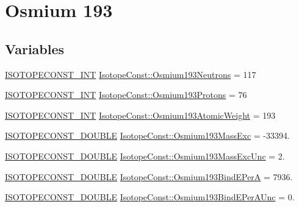 \hypertarget{group___isotope_const-_osmium-_os193}{}\section{Osmium 193}
\label{group___isotope_const-_osmium-_os193}
\subsection*{Variables}
\begin{DoxyCompactItemize}
\item 
\mbox{\hyperlink{group___isotope_const-_macros_ga5f18360b3e99483a35c32d789e62621c}{I\+S\+O\+T\+O\+P\+E\+C\+O\+N\+S\+T\+\_\+\+I\+NT}} \mbox{\hyperlink{group___isotope_const-_osmium-_os193_gaa1ee9d94e0ae684cde3d64fd0a91d388}{Isotope\+Const\+::\+Osmium193\+Neutrons}} = 117
\item 
\mbox{\hyperlink{group___isotope_const-_macros_ga5f18360b3e99483a35c32d789e62621c}{I\+S\+O\+T\+O\+P\+E\+C\+O\+N\+S\+T\+\_\+\+I\+NT}} \mbox{\hyperlink{group___isotope_const-_osmium-_os193_ga3396de6fa3a80d80ea75b9d761cbe62d}{Isotope\+Const\+::\+Osmium193\+Protons}} = 76
\item 
\mbox{\hyperlink{group___isotope_const-_macros_ga5f18360b3e99483a35c32d789e62621c}{I\+S\+O\+T\+O\+P\+E\+C\+O\+N\+S\+T\+\_\+\+I\+NT}} \mbox{\hyperlink{group___isotope_const-_osmium-_os193_ga7cbf166a0585b85ea83894f05a0ce41c}{Isotope\+Const\+::\+Osmium193\+Atomic\+Weight}} = 193
\item 
\mbox{\hyperlink{group___isotope_const-_macros_ga8f45a7272ce02c0b4c65c44636ed719a}{I\+S\+O\+T\+O\+P\+E\+C\+O\+N\+S\+T\+\_\+\+D\+O\+U\+B\+LE}} \mbox{\hyperlink{group___isotope_const-_osmium-_os193_ga5c377898e353a908cd466e191eb4cff1}{Isotope\+Const\+::\+Osmium193\+Mass\+Exc}} = -\/33394.
\item 
\mbox{\hyperlink{group___isotope_const-_macros_ga8f45a7272ce02c0b4c65c44636ed719a}{I\+S\+O\+T\+O\+P\+E\+C\+O\+N\+S\+T\+\_\+\+D\+O\+U\+B\+LE}} \mbox{\hyperlink{group___isotope_const-_osmium-_os193_ga317f9285acd5c57d26004649a86bbf31}{Isotope\+Const\+::\+Osmium193\+Mass\+Exc\+Unc}} = 2.
\item 
\mbox{\hyperlink{group___isotope_const-_macros_ga8f45a7272ce02c0b4c65c44636ed719a}{I\+S\+O\+T\+O\+P\+E\+C\+O\+N\+S\+T\+\_\+\+D\+O\+U\+B\+LE}} \mbox{\hyperlink{group___isotope_const-_osmium-_os193_ga8c9bbc82dc496db3c3b3fdea14d7028e}{Isotope\+Const\+::\+Osmium193\+Bind\+E\+PerA}} = 7936.
\item 
\mbox{\hyperlink{group___isotope_const-_macros_ga8f45a7272ce02c0b4c65c44636ed719a}{I\+S\+O\+T\+O\+P\+E\+C\+O\+N\+S\+T\+\_\+\+D\+O\+U\+B\+LE}} \mbox{\hyperlink{group___isotope_const-_osmium-_os193_ga96ea7d2ba45118a43faf2861fb516f1b}{Isotope\+Const\+::\+Osmium193\+Bind\+E\+Per\+A\+Unc}} = 0.

\end{DoxyCompactItemize}
